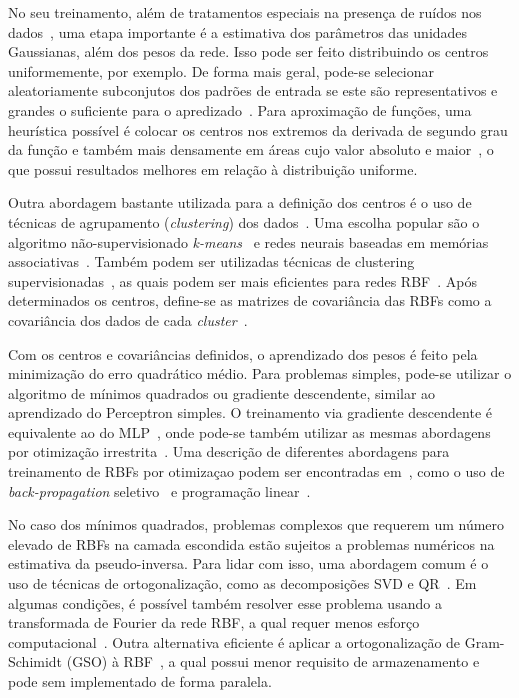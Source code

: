 \documentclass[conference]{IEEEtran}
\begin{document}
	No seu treinamento, além de tratamentos especiais na presença de ruídos nos dados~\cite{broomhead1988radial}, uma etapa importante é a estimativa dos parâmetros das unidades Gaussianas, além dos pesos da rede. Isso pode ser feito distribuindo os centros uniformemente, por exemplo. De forma mais geral, pode-se selecionar aleatoriamente subconjutos dos padrões de entrada se este são representativos e grandes o suficiente para o apredizado~\cite{wu2012using}. Para aproximação de funções, uma heurística possível é colocar os centros nos extremos da derivada de segundo grau da função e também mais densamente em áreas cujo valor absoluto e maior~\cite{sanchez1995second}, o que possui resultados melhores em relação à distribuição uniforme.
	
	Outra abordagem bastante utilizada para a definição dos centros é o uso de técnicas de agrupamento (\textit{clustering}) dos dados~\cite{du2006neural, du2010clustering}.  Uma escolha popular são o algoritmo não-supervisionado \textit{k-means}~\cite{moody1989fast} e redes neurais baseadas em memórias associativas~\cite{kohonen2012self}. Também podem ser utilizadas técnicas de clustering supervisionadas~\cite{chen1993hybrid}, as quais podem ser mais eficientes para redes RBF~\cite{wu2012using}. Após determinados os centros, define-se as matrizes de covariância das RBFs como a covariância dos dados de cada \textit{cluster}~\cite{wu2012using}. 
	
	Com os centros e covariâncias definidos, o aprendizado dos pesos é feito pela minimização do erro quadrático médio. Para problemas simples, pode-se utilizar o algoritmo de mínimos quadrados ou gradiente descendente, similar ao aprendizado do Perceptron simples. O treinamento via gradiente descendente é equivalente ao do MLP~\cite{wettschereck1992improving}, onde pode-se também utilizar as mesmas abordagens por otimização irrestrita~\cite{du2006neural}. Uma descrição de diferentes abordagens para treinamento de RBFs por otimizaçao podem ser encontradas em~\cite{wu2012using}, como o uso de \textit{back-propagation} seletivo~\cite{vakil2004training} e programação linear~\cite{roy1995algorithm}.
	
	No caso dos mínimos quadrados, problemas complexos que requerem um número elevado de RBFs na camada escondida estão sujeitos a problemas numéricos na estimativa da pseudo-inversa. Para lidar com isso, uma abordagem comum é o uso de técnicas de ortogonalização, como as decomposições SVD e QR~\cite{golub1980analysis}. Em algumas condições, é possível também resolver esse problema usando a transformada de Fourier da rede RBF, a qual requer menos esforço computacional~\cite{abe2003fast}. Outra alternativa eficiente é aplicar a ortogonalização de Gram-Schimidt (GSO) à RBF~\cite{kaminski1997kernel}, a qual possui menor requisito de armazenamento e pode sem implementado de forma paralela.
	
\end{document}
